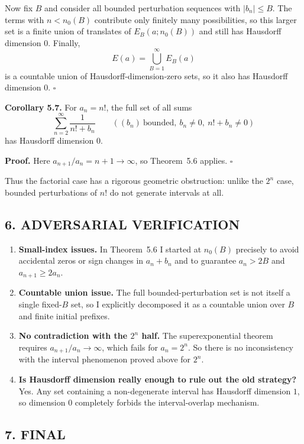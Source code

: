 Now fix $B$ and consider all bounded perturbation sequences with $|b_n|\le B$.  The terms with $n<n_0(B)$ contribute only finitely many possibilities, so this larger set is a finite union of translates of $E_B(a;n_0(B))$ and still has Hausdorff dimension $0$.  Finally,
\[
E(a)=\bigcup_{B=1}^{\infty} E_B(a)
\]
is a countable union of Hausdorff-dimension-zero sets, so it also has Hausdorff dimension $0$.
\hfill $\square$

\medskip
\noindent
\textbf{Corollary 5.7.}
For $a_n=n!$, the full set of all sums
\[
\sum_{n=2}^{\infty}\frac{1}{n!+b_n}
\qquad ((b_n)\ \mbox{bounded},\ b_n\ne 0,\ n!+b_n\ne 0)
\]
has Hausdorff dimension $0$.

\medskip
\noindent
\textbf{Proof.}
Here $a_{n+1}/a_n=n+1\to\infty$, so Theorem~5.6 applies.
\hfill $\square$

\medskip
Thus the factorial case has a rigorous geometric obstruction: unlike the $2^n$ case, bounded perturbations of $n!$ do not generate intervals at all.

\subsection*{6. ADVERSARIAL VERIFICATION}

\begin{enumerate}
\item \textbf{Small-index issues.}  In Theorem~5.6 I started at $n_0(B)$ precisely to avoid accidental zeros or sign changes in $a_n+b_n$ and to guarantee $a_n>2B$ and $a_{n+1}\ge 2a_n$.
\item \textbf{Countable union issue.}  The full bounded-perturbation set is not itself a single fixed-$B$ set, so I explicitly decomposed it as a countable union over $B$ and finite initial prefixes.
\item \textbf{No contradiction with the $2^n$ half.}  The superexponential theorem requires $a_{n+1}/a_n\to\infty$, which fails for $a_n=2^n$.  So there is no inconsistency with the interval phenomenon proved above for $2^n$.
\item \textbf{Is Hausdorff dimension really enough to rule out the old strategy?}  Yes.  Any set containing a non-degenerate interval has Hausdorff dimension $1$, so dimension $0$ completely forbids the interval-overlap mechanism.
\end{enumerate}

\subsection*{7. FINAL}

